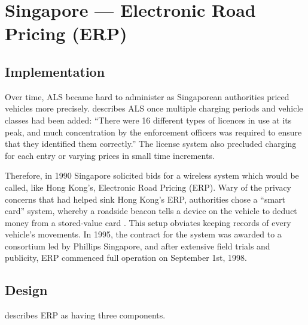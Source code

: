 \section{Singapore --- Electronic Road Pricing (ERP)}\label{sec:erp}

\subsection{Implementation}

Over time, ALS became hard to administer as Singaporean authorities priced vehicles more precisely. \citet[p. 4]{Chin2009} describes ALS once multiple charging periods and vehicle classes had been added: ``There were 16 different types of licences in use at its peak, and much concentration by the enforcement officers was required to ensure that they identified them correctly.'' The license system also precluded charging for each entry or varying prices in small time increments.

Therefore, in 1990 Singapore solicited bids for a wireless system which would be called, like Hong Kong's, Electronic Road Pricing (ERP). Wary of the privacy concerns that had helped sink Hong Kong's ERP, authorities chose a ``smart card'' system, whereby a roadside beacon tells a device on the vehicle to deduct money from a stored-value card \citep{PhangToh1997,Chin2009}. This setup obviates keeping records of every vehicle's movements. In 1995, the contract for the system was awarded to a consortium led by Phillips Singapore, and after extensive field trials and publicity, ERP commenced full operation on September 1st, 1998.

\subsection{Design}

\citet{Menon2004} describes ERP as having three components.

